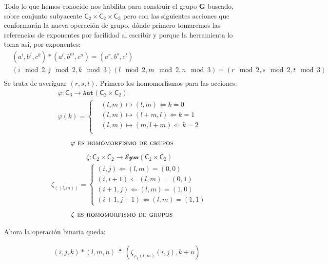 \documentclass[12pt,a4paper,fleqn,spanish,final,openright]{extbook}
\theoremstyle{definition}
\theoremstyle{remark}
\begin{document}
Todo lo que hemos conocido nos habilita para construir el grupo $\mathbf{G}$ buscado, sobre conjunto subyacente $\mathsf{C}_{2} \times \mathsf{C}_{2} \times \mathsf{C}_3$ pero con las siguientes acciones que conformarán la nueva operación de grupo, dónde primero tomaremos las referencias de exponentes por facilidad al escribir y porque la herramienta lo toma así, por exponentes:
\begin{align*}
&(a^i,b^j,c^k)*(a^l,b^m,c^n)=(a^r,b^s,c^t)\\
&(i\mod 2,j\mod 2,k\mod 3)(l\mod 2,m\mod 2,n\mod 3)=(r\mod 2,s\mod 2,t\mod 3)\\
\end{align*}
Se trata de averiguar $(r,s,t)$.
Primero los homomorfismos para las acciones:
\begin{align*}
&\varphi : \mathsf{C}_{3}  \longrightarrow  \mathtt{Aut}(\mathsf{C}_{2}\times\mathsf{C}_{2})\\
&\varphi \left( k \right) =
\begin{cases}
&(l,m) \mapsto (l,m)  \Leftarrow  k=0\\
&(l,m) \mapsto (l+m,l) \Leftarrow  k=1\\
&(l,m) \mapsto (m,l+m) \Leftarrow  k=2\\
\end{cases}
\end{align*}
\begin{align*}
&\varphi \mbox{\textsc{ es homomorfismo de grupos }}
\end{align*}
\begin{align*}
&\zeta : {\mathsf{C}}_{2} \times {\mathsf{C}}_{2}  \longrightarrow  {\mathcal{Sym}}
{\left({{\mathsf{C}}_{2} \times {\mathsf{C}}_{2}}\right)}
\end{align*}
\begin{align*}
&{\zeta }_{\left((l,m)\right)}=
\begin{cases}
(i,j)  \Leftarrow (l,m)=(0,0)\\
(i,i+1)  \Leftarrow  (l,m)=(0,1)\\
(i+1,j)  \Leftarrow  (l,m)=(1,0)\\
(i+1,j+1)  \Leftarrow  (l,m)=(1,1)
\end{cases}
\end{align*}
\begin{align*}
& \zeta \mbox{\textsc{ es homomorfismo de grupos }}
\end{align*}

Ahora la operación binaria queda:

\begin{align*}
(i,j,k)*(l,m,n)\triangleq
(
{\zeta}_{\varphi_k(l,m)}(i,j),
k+n
)
\end{align*}
\end{document}
